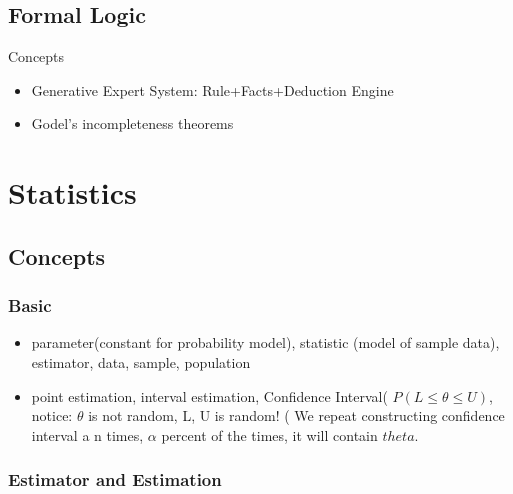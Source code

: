 \documentclass[11pt, openany]{book}              %
\begin{document}
\section{Formal Logic}

Concepts
\begin{itemize}
    \item Generative Expert System: Rule+Facts+Deduction Engine 
    \item Godel's incompleteness theorems
\end{itemize}

\chapter{Statistics}

\section{Concepts}
\subsection{Basic}
\begin{itemize}
    \item parameter(constant for probability model), statistic (model of sample data), estimator, data, sample, population
    \item point estimation, interval estimation, Confidence Interval( $P(L \leq \theta \leq U )$, notice: $\theta$ is not random, L, U is random! ( We repeat constructing confidence interval a n times, $\alpha$ percent of the times, it will contain $theta$.
\end{itemize}

\subsection{Estimator and Estimation}
\end{document}
